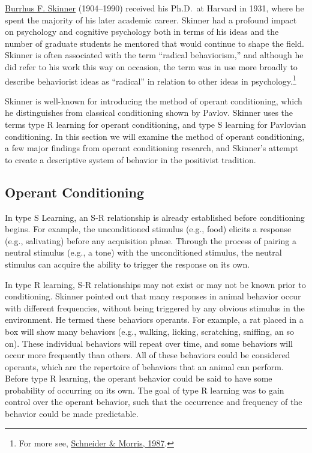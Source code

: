 \documentclass[
  oneside,
  12pt]{crumpbook}
\begin{document}
\href{https://en.wikipedia.org/wiki/B._F._Skinner}{Burrhus F. Skinner} (1904--1990) received his Ph.D.~at Harvard in 1931, where he spent the majority of his later academic career. Skinner had a profound impact on psychology and cognitive psychology both in terms of his ideas and the number of graduate students he mentored that would continue to shape the field. Skinner is often associated with the term ``radical behaviorism,'' and although he did refer to his work this way on occasion, the term was in use more broadly to describe behaviorist ideas as ``radical'' in relation to other ideas in psychology.\footnote{For more see, \protect\hyperlink{ref-schneiderHistoryTermRadical1987}{Schneider \& Morris, 1987}.}

Skinner is well-known for introducing the method of operant conditioning, which he distinguishes from classical conditioning shown by Pavlov. Skinner uses the terms type R learning for operant conditioning, and type S learning for Pavlovian conditioning. In this section we will examine the method of operant conditioning, a few major findings from operant conditioning research, and Skinner's attempt to create a descriptive system of behavior in the positivist tradition.

\hypertarget{operant-conditioning}{%
\subsection{Operant Conditioning}\label{operant-conditioning}}

In type S Learning, an S-R relationship is already established before conditioning begins. For example, the unconditioned stimulus (e.g., food) elicits a response (e.g., salivating) before any acquisition phase. Through the process of pairing a neutral stimulus (e.g., a tone) with the unconditioned stimulus, the neutral stimulus can acquire the ability to trigger the response on its own.

In type R learning, S-R relationships may not exist or may not be known prior to conditioning. Skinner pointed out that many responses in animal behavior occur with different frequencies, without being triggered by any obvious stimulus in the environment. He termed these behaviors operants. For example, a rat placed in a box will show many behaviors (e.g., walking, licking, scratching, sniffing, an so on). These individual behaviors will repeat over time, and some behaviors will occur more frequently than others. All of these behaviors could be considered operants, which are the repertoire of behaviors that an animal can perform. Before type R learning, the operant behavior could be said to have some probability of occurring on its own. The goal of type R learning was to gain control over the operant behavior, such that the occurrence and frequency of the behavior could be made predictable.
\end{document}
